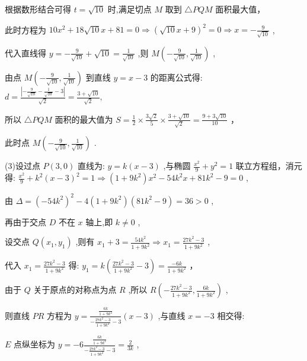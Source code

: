 \documentclass[10pt]{article}
\begin{document}
根据数形结合可得 \(t = \sqrt{10}\) 时,满足切点 \(M\) 取到 \(\bigtriangleup  {PQM}\) 面积最大值，

此时方程为 \({10}{x}^{2} + {18}\sqrt{10}x + {81} = 0 \Rightarrow  {\left( \sqrt{10}x + 9\right) }^{2} = 0 \Rightarrow  x =  - \frac{9}{\sqrt{10}}\) ,

代入直线得 \(y =  - \frac{9}{\sqrt{10}} + \sqrt{10} = \frac{1}{\sqrt{10}}\) ,则 \(M\left( {-\frac{9}{\sqrt{10}},\frac{1}{\sqrt{10}}}\right)\) ,

由点 \(M\left( {-\frac{9}{\sqrt{10}},\frac{1}{\sqrt{10}}}\right)\) 到直线 \(y = x - 3\) 的距离公式得: \(d = \frac{\left| -\frac{9}{\sqrt{10}} - \frac{1}{\sqrt{10}} - 3\right| }{\sqrt{2}} = \frac{3 + \sqrt{10}}{\sqrt{2}},\)

所以 \(\bigtriangleup  {PQM}\) 面积的最大值为 \(S = \frac{1}{2} \times  \frac{3\sqrt{2}}{5} \times  \frac{3 + \sqrt{10}}{\sqrt{2}} = \frac{9 + 3\sqrt{10}}{10}\) ，

此时点 \(M\left( {-\frac{9}{\sqrt{10}},\frac{1}{\sqrt{10}}}\right)\) .

(3)设过点 \(P\left( {3,0}\right)\) 直线为: \(y = k\left( {x - 3}\right)\) ,与椭圆 \(\frac{{x}^{2}}{9} + {y}^{2} = 1\) 联立方程组，消元得: \(\frac{{x}^{2}}{9} + {k}^{2}{\left( x - 3\right) }^{2} = 1 \Rightarrow  \left( {1 + 9{k}^{2}}\right) {x}^{2} - {54}{k}^{2}x + {81}{k}^{2} - 9 = 0\) ,

由 \(\Delta  = {\left( -{54}{k}^{2}\right) }^{2} - 4\left( {1 + 9{k}^{2}}\right) \left( {{81}{k}^{2} - 9}\right)  = {36} > 0\) ,

再由于交点 \(D\) 不在 \(x\) 轴上,即 \(k \neq  0\) ,

设交点 \(Q\left( {{x}_{1},{y}_{1}}\right)\) ,则有 \({x}_{1} + 3 = \frac{{54}{k}^{2}}{1 + 9{k}^{2}} \Rightarrow  {x}_{1} = \frac{{27}{k}^{2} - 3}{1 + 9{k}^{2}}\) ,

代入 \({x}_{1} = \frac{{27}{k}^{2} - 3}{1 + 9{k}^{2}}\) 得: \({y}_{1} = k\left( {\frac{{27}{k}^{2} - 3}{1 + 9{k}^{2}} - 3}\right)  = \frac{-{6k}}{1 + 9{k}^{2}}\) ，

由于 \(Q\) 关于原点的对称点为点 \(R\) ,所以 \(R\left( {-\frac{{27}{k}^{2} - 3}{1 + 9{k}^{2}},\frac{6k}{1 + 9{k}^{2}}}\right)\) ,

则直线 \({PR}\) 方程为 \(y = \frac{\frac{6k}{1 + 9{k}^{2}}}{-\frac{{27}{k}^{2} - 3}{1 + 9{k}^{2}} - 3}\left( {x - 3}\right)\) ,与直线 \(x =  - 3\) 相交得:

\(E\) 点纵坐标为 \(y =  - 6\frac{\frac{6k}{1 + 9{k}^{2}}}{-\frac{{27}{k}^{2} - 3}{1 + 9{k}^{2}} - 3} = \frac{2}{3k}\) ,
\end{document}
